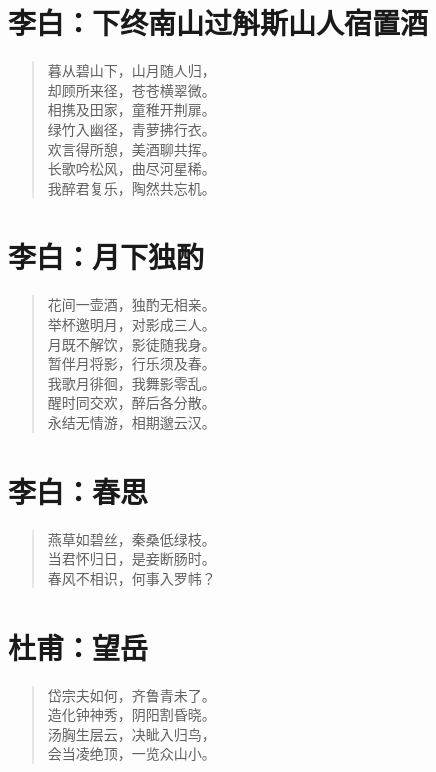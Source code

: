 \documentclass[12pt,oneside]{book}
\newenvironment{shici}{%
\begin{verse}\centering\yanti\large\hspace{12pt}}{\end{verse}}
\begin{document}
\begin{common-format}
\chapter{李白：下终南山过斛斯山人宿置酒}
\begin{shici}
暮从碧山下，山月随人归，\\
却顾所来径，苍苍横翠微。\\
相携及田家，童稚开荆扉。\\
绿竹入幽径，青萝拂行衣。\\
欢言得所憩，美酒聊共挥。\\
长歌吟松风，曲尽河星稀。\\
我醉君复乐，陶然共忘机。
\end{shici}

\chapter{李白：月下独酌}
\begin{shici}
花间一壶酒，独酌无相亲。\\
举杯邀明月，对影成三人。\\
月既不解饮，影徒随我身。\\
暂伴月将影，行乐须及春。\\
我歌月徘徊，我舞影零乱。\\
醒时同交欢，醉后各分散。\\
永结无情游，相期邈云汉。
\end{shici}

\chapter{李白：春思}
\begin{shici}
燕草如碧丝，秦桑低绿枝。\\
当君怀归日，是妾断肠时。\\
春风不相识，何事入罗帏？
\end{shici}

\chapter{杜甫：望岳}
\begin{shici}
岱宗夫如何，齐鲁青未了。\\
造化钟神秀，阴阳割昏晓。\\
汤胸生层云，决眦入归鸟，\\
会当凌绝顶，一览众山小。
\end{shici}



\end{common-format}
\end{document}
